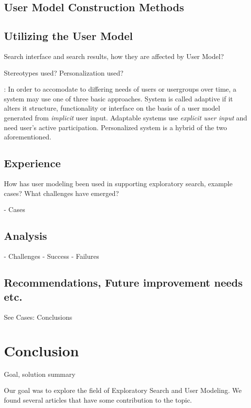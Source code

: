 \documentclass{sigchi}
\begin{document}
\subsection{User Model Construction Methods}

\subsection{Utilizing the User Model}

Search interface and search results, how they are affected by User Model?

Stereotypes used? Personalization used?

\cite{van08}: 
In order to accomodate to differing needs of users or usergroups over time, a system may use one of three basic approaches. System is called adaptive if it alters it structure, functionality or interface on the basis of a user model generated from \textit{implicit} user input. Adaptable systems use \textit{explicit user input} and need user's active participation. Personalized system is a hybrid of the two aforementioned.

\subsection{Experience}

How has user modeling been used in supporting exploratory search, example cases? What challenges have emerged? 

- Cases

\subsection{Analysis}

- Challenges
- Success
- Failures

\subsection{Recommendations, Future improvement needs etc.}

See Cases: Conclusions

\section{Conclusion}
Goal, solution summary

Our goal was to explore the field of Exploratory Search and User Modeling. We found several articles that have some contribution to the topic.
\end{document}
